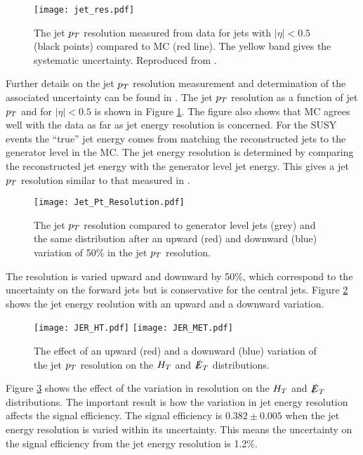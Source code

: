 \begin{figure}
\begin{center}
\texttt{[image: jet\_res.pdf]}
\end{center}
\caption{The jet $p_{T}$ resolution measured from data for jets with $|\eta| <
0.5$ (black points) compared to MC (red line). The yellow band gives the
systematic uncertainty. Reproduced from \cite{jec}.}
\label{fig:jet_res}
\end{figure}

Further details on the jet $p_{T}$ resolution measurement and determination of the
associated uncertainty can be found in \cite{jec}. The jet $p_{T}$ resolution as a
function of jet $p_{T}$ and for $|\eta| < 0.5$ is shown in Figure
\ref{fig:jet_res}. The figure also shows that MC agrees well with the
data as far as jet energy resolution is concerned. For the SUSY events the 
``true'' jet energy comes from matching the reconstructed jets to the generator 
level in the MC. The jet energy resolution is determined by comparing the 
reconstructed jet energy with the generator level jet energy. This gives a jet 
$p_{T}$ resolution similar to that measured in \cite{jec}. \\

\begin{figure}
\begin{center}
\texttt{[image: Jet\_Pt\_Resolution.pdf]}
\end{center}
\caption{The jet $p_{T}$ resolution compared to generator level jets (grey) and
the same distribution after an upward (red) and downward (blue) 
variation of 50\unit{\%} in the jet $p_{T}$ resolution.}
\label{fig:Resolution}
\end{figure}

The resolution is varied upward and downward by 50\unit{\%}, which correspond to 
the uncertainty on the forward jets but is conservative for the central jets. 
Figure \ref{fig:Resolution} shows the jet energy reolution with an upward and a 
downward variation. \\

\begin{figure}
\texttt{[image: JER\_HT.pdf]}
\texttt{[image: JER\_MET.pdf]}
\caption{The effect of an upward (red) and a downward (blue) variation
of the jet $p_{T}$ resolution on the $H_{T}$ and $\slashed{E}_{T}$ distributions.}
\label{fig:JER}
\end{figure}

Figure \ref{fig:JER} shows the effect of the variation in resolution on the
$H_{T}$ and $\slashed{E}_{T}$ distributions. The important result is how the variation in jet 
energy resolution affects the signal efficiency. The signal efficiency is 
$0.382\pm0.005$ when the jet energy resolution is varied within its uncertainty. 
This means the uncertainty on the signal efficiency from the jet energy
resolution is 1.2\unit{\%}.

